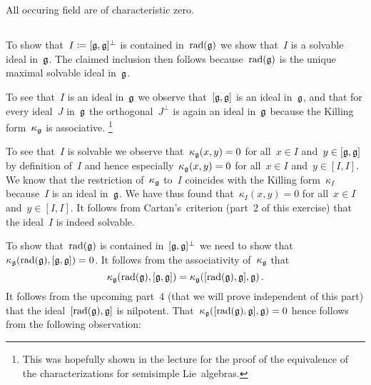 \section{}

All occuring field are of characteristic zero.





\addtocounter{subsection}{1}





\addtocounter{subsection}{1}





\subsection{}

To show that~$I \coloneqq [\mathfrak{g}, \mathfrak{g}]^\perp$ is contained in~$\operatorname{rad}(\mathfrak{g})$ we show that~$I$ is a solvable ideal in~$\mathfrak{g}$.
The claimed inclusion then follows because~$\operatorname{rad}(\mathfrak{g})$ is the unique maximal solvable ideal in~$\mathfrak{g}$.

To see that~$I$ is an ideal in~$\mathfrak{g}$ we observe that~$[\mathfrak{g}, \mathfrak{g}]$ is an ideal in~$\mathfrak{g}$, and that for every ideal~$J$ in~$\mathfrak{g}$ the orthogonal~$J^\perp$ is again an ideal in~$\mathfrak{g}$ because the Killing form~$\kappa_{\mathfrak{g}}$ is associative.%
\footnote{This was hopefully shown in the lecture for the proof of the equivalence of the characterizations for semisimple Lie~algebras.}

To see that~$I$ is solvable we observe that~$\kappa_{\mathfrak{g}}(x,y) = 0$ for all~$x \in I$ and~$y \in [\mathfrak{g}, \mathfrak{g}]$ by definition of~$I$ and hence especially~$\kappa_{\mathfrak{g}}(x,y) = 0$ for all~$x \in I$ and~$y \in [I,I]$.
We know that the restriction of~$\kappa_{\mathfrak{g}}$ to~$I$ coincides with the Killing form~$\kappa_I$ because~$I$ is an ideal in~$\mathfrak{g}$.
We have thus found that~$\kappa_I(x,y) = 0$ for all~$x \in I$ and~$y \in [I,I]$.
It follows from Cartan’s~criterion (part~2 of this exercise) that the ideal~$I$ is indeed solvable.

To show that~$\operatorname{rad}(\mathfrak{g})$ is contained in~$[\mathfrak{g}, \mathfrak{g}]^\perp$ we need to show that~$\kappa_{\mathfrak{g}}(\operatorname{rad}(\mathfrak{g}), [\mathfrak{g}, \mathfrak{g}]) = 0$.
It follows from the associativity of~$\kappa_{\mathfrak{g}}$ that
\[
  \kappa_{\mathfrak{g}}(\operatorname{rad}(\mathfrak{g}), [\mathfrak{g}, \mathfrak{g}])
  =
  \kappa_{\mathfrak{g}}([\operatorname{rad}(\mathfrak{g}), \mathfrak{g}], \mathfrak{g})  \,.
\]
It follows from the upcoming part~4 (that we will prove independent of this part) that the ideal~$[\operatorname{rad}(\mathfrak{g}), \mathfrak{g}]$ is nilpotent.
That~$\kappa_{\mathfrak{g}}([\operatorname{rad}(\mathfrak{g}), \mathfrak{g}], \mathfrak{g}) = 0$ hence follows from the following observation:

